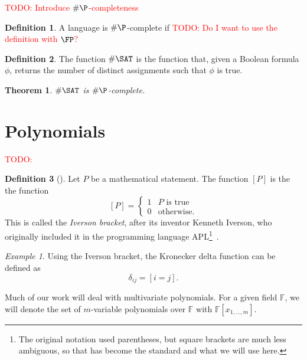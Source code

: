 \documentclass[english,12pt]{reedthesis}
\theoremstyle{plain}
\newtheorem{thm}{Theorem}[section]
\theoremstyle{definition}
\newtheorem{defn}[defn]{Definition}
\theoremstyle{remark}
\newtheorem{example}{Example}[thm]
\newcommand{\TODO}[1]{\textcolor{red}{TODO: #1}}
\begin{document}
\TODO{Introduce $\#\P$-completeness}

\begin{defn}\label{def:hash-p-complete}
  A language is $\#\P$-complete if \TODO{Do I want to use the definition with $\FP$?}
\end{defn}

\begin{defn}\label{def:hash-sat}
  The function $\#\SAT$ is the function that, given a Boolean formula $\phi$,
  returns the number of distinct assignments such that $\phi$ is true.
\end{defn}

\begin{thm}\label{thm-hash-sat-is-complete}
  $\#\SAT$ is $\#\P$-complete.
\end{thm}

\section{Polynomials}\label{sec:polynomial}

\TODO{}

\begin{defn}[{\cite{Knu92}}]\label{def:iverson-bracket}
  Let $P$ be a mathematical statement. The function $[P]$ is the the function
  \begin{equation}\label{eqn:iverson-bracket}
    [P] = \begin{cases}
      1 & P \text{ is true} \\
      0 & \text{otherwise.}
    \end{cases}
  \end{equation}
  This is called the \emph{Iverson bracket}, after its inventor Kenneth Iverson,
  who originally included it in the programming language APL\footnote{The
    original notation used parentheses, but square brackets are much less
    ambiguous, so that has become the standard and what we will use
    here.}~\cite[11]{APL}.
\end{defn}

\begin{example}
  Using the Iverson bracket, the Kronecker delta function can be defined as
  \[
    \delta_{ij} = [i = j].
  \]
\end{example}

Much of our work will deal with multivariate polynomials. For a given field
$\mathbb{F}$, we will denote the set of $m$-variable polynomials over
$\mathbb{F}$ with $\mathbb{F}[x_{1, \ldots, m}]$.
\end{document}
